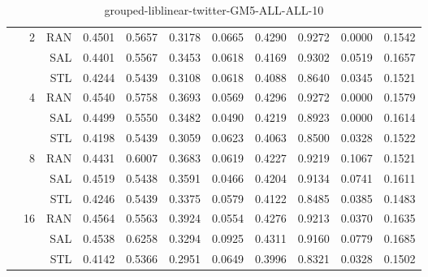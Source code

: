 \begin{center}
\begin{table}[htbp]
\begin{center}
\begin{tabular}{ | r | r | r | r | r | r | r | r | r | r | r |}
 & \multirow{3}{*}{2} & RAN & 0.4501 & 0.5657 & 0.3178 & 0.0665 & 0.4290 & 0.9272 & 0.0000 & 0.1542\\ \cline{3-11}
 &   & SAL & 0.4401 & 0.5567 & 0.3453 & 0.0618 & 0.4169 & 0.9302 & 0.0519 & 0.1657\\ \cline{3-11}
 &   & STL & 0.4244 & 0.5439 & 0.3108 & 0.0618 & 0.4088 & 0.8640 & 0.0345 & 0.1521\\ \cline{2-11}
 & \multirow{3}{*}{4} & RAN & 0.4540 & 0.5758 & 0.3693 & 0.0569 & 0.4296 & 0.9272 & 0.0000 & 0.1579\\ \cline{3-11}
 &   & SAL & 0.4499 & 0.5550 & 0.3482 & 0.0490 & 0.4219 & 0.8923 & 0.0000 & 0.1614\\ \cline{3-11}
 &   & STL & 0.4198 & 0.5439 & 0.3059 & 0.0623 & 0.4063 & 0.8500 & 0.0328 & 0.1522\\ \cline{2-11}
 & \multirow{3}{*}{8} & RAN & 0.4431 & 0.6007 & 0.3683 & 0.0619 & 0.4227 & 0.9219 & 0.1067 & 0.1521\\ \cline{3-11}
 &   & SAL & 0.4519 & 0.5438 & 0.3591 & 0.0466 & 0.4204 & 0.9134 & 0.0741 & 0.1611\\ \cline{3-11}
 &   & STL & 0.4246 & 0.5439 & 0.3375 & 0.0579 & 0.4122 & 0.8485 & 0.0385 & 0.1483\\ \cline{2-11}
 & \multirow{3}{*}{16} & RAN & 0.4564 & 0.5563 & 0.3924 & 0.0554 & 0.4276 & 0.9213 & 0.0370 & 0.1635\\ \cline{3-11}
 &   & SAL & 0.4538 & 0.6258 & 0.3294 & 0.0925 & 0.4311 & 0.9160 & 0.0779 & 0.1685\\ \cline{3-11}
 &   & STL & 0.4142 & 0.5366 & 0.2951 & 0.0649 & 0.3996 & 0.8321 & 0.0328 & 0.1502\\ \cline{2-11}
\hline
\end{tabular}
\caption{grouped-liblinear-twitter-GM5-ALL-ALL-10}
\end{center}
 \end{table}
\end{center}


